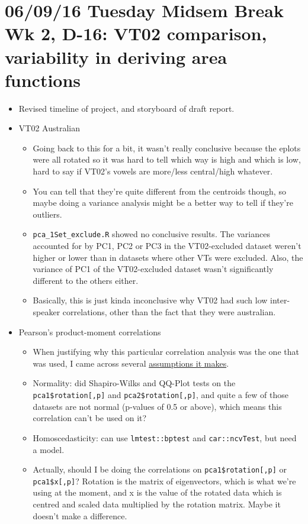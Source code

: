 \documentclass{article}
\begin{document}
\section*{06/09/16 Tuesday Midsem Break Wk 2, D-16: VT02 comparison, variability in deriving area functions}
\begin{itemize}
    \item Revised timeline of project, and storyboard of draft report.
    \item VT02 Australian
    \begin{itemize}
        \item Going back to this for a bit, it wasn't really conclusive because the eplots were all rotated so it was hard to tell which way is high and which is low, hard to say if VT02's vowels are more/less central/high whatever.
        \item You can tell that they're quite different from the centroids though, so maybe doing a variance analysis might be a better way to tell if they're outliers.
        \item \verb|pca_1Set_exclude.R| showed no conclusive results. The variances accounted for by PC1, PC2 or PC3 in the VT02-excluded dataset weren't higher or lower than in datasets where other VTs were excluded. Also, the variance of PC1 of the VT02-excluded dataset wasn't significantly different to the others either.
        \item Basically, this is just kinda inconclusive why VT02 had such low inter-speaker correlations, other than the fact that they were australian.
    \end{itemize}
    \item Pearson's product-moment correlations
    \begin{itemize}
        \item When justifying why this particular correlation analysis was the one that was used, I came across several \href{https://statistics.laerd.com/statistical-guides/pearson-correlation-coefficient-statistical-guide.php}{assumptions it makes}.
        \item Normality: did Shapiro-Wilks and QQ-Plot tests on the \verb|pca1$rotation[,p]| and \verb|pca2$rotation[,p]|, and quite a few of those datasets are not normal (p-values of 0.5 or above), which means this correlation can't be used on it?
        \item Homoscedasticity: can use \verb|lmtest::bptest| and \verb|car::ncvTest|, but need a model.
        \item Actually, should I be doing the correlations on \verb|pca1$rotation[,p]| or \verb|pca1$x[,p]|? Rotation is the matrix of eigenvectors, which is what we're using at the moment, and x is the value of the rotated data which is centred and scaled data multiplied by the rotation matrix. Maybe it doesn't make a difference.

\end{itemize}
\end{itemize}
\end{document}

